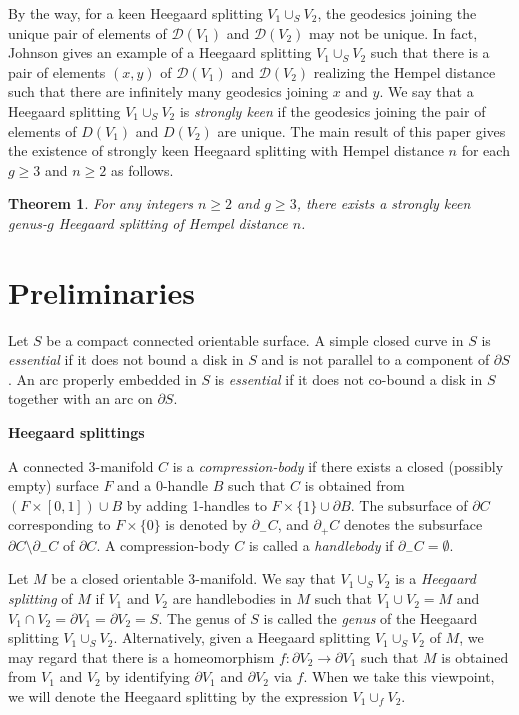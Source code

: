 \documentclass[]{aspm}
\newtheorem{theorem}[definition]{Theorem}
\begin{document}
By the way, for a keen Heegaard splitting $V_{1}\cup_{S}V_{2}$, the geodesics joining the unique pair of elements of $\mathcal{D}(V_{1})$ and $\mathcal{D}(V_{2})$  may not be unique. 
In fact, Johnson \cite{Jo} gives an example of a Heegaard splitting $V_{1}\cup_{S}V_{2}$ such that there is a pair of elements $(x, y)$ of $\mathcal{D}(V_{1})$ and $\mathcal{D}(V_{2})$ realizing the Hempel distance such that there are infinitely many geodesics joining $x$ and $y$.    
We say that a Heegaard splitting $V_{1}\cup_{S} V_{2}$ is {\it strongly keen} if the geodesics joining the pair of elements of $D(V_{1})$ and $D(V_{2})$ are unique. 
The main result of this paper gives the existence of strongly keen Heegaard splitting with Hempel distance $n$ for each $g\geq3$ and $n\geq2$ as follows.   


\begin{theorem}\label{thm-1}
For any integers $n\geq 2$ and $g\geq 3$, there exists a strongly keen genus-$g$ Heegaard splitting of Hempel distance $n$.
\end{theorem}







\section{Preliminaries}\label{sec-pre}

Let $S$ be a compact connected orientable surface. 
A simple closed curve in $S$ is {\it essential} if it does not bound a disk in $S$ and is not parallel to a component of $\partial{S}$. 
An arc properly embedded in $S$ is {\it essential} if it does not co-bound a disk in $S$ together with an arc on $\partial{S}$. 


\medskip
\noindent
{\bf Heegaard splittings}

A connected 3-manifold $C$ is a {\it compression-body} if there exists a closed (possibly empty) surface $F$ and a 0-handle $B$ such that $C$ is obtained from $(F\times[0, 1])\cup B$ 
by adding 1-handles to $F \times \{1\}\cup \partial B$. 
The subsurface of $\partial C$ corresponding to $F\times\{0\}$ is denoted by $\partial_{-} C$, and $\partial_{+} C$ denotes the subsurface $\partial C\setminus\partial_{-} C$ of $\partial C$. 
A compression-body $C$ is called a {\it handlebody} if $\partial_- C=\emptyset$.

Let $M$ be a closed orientable 3-manifold. 
We say that $V_{1}\cup_S V_{2}$ is a {\it Heegaard splitting} of $M$ if $V_{1}$ and $V_{2}$ are handlebodies in $M$ such that $V_{1}\cup V_{2}=M$ and $V_1\cap V_2=\partial V_{1}=\partial V_{2}=S$. 
The genus of $S$ is called the {\it genus} of the Heegaard splitting $V_{1}\cup_S V_{2}$. 
Alternatively, given a Heegaard splitting $V_{1}\cup_S V_{2}$ of $M$, we may regard that there is a homeomorphism $f:\partial V_2\rightarrow\partial V_1$ such that $M$ is obtained from $V_1$ and $V_2$ by identifying $\partial V_1$ and $\partial V_2$ via $f$.
When we take this viewpoint, we will denote the Heegaard splitting by the expression $V_{1}\cup_{f}V_{2}$.
\end{document}
